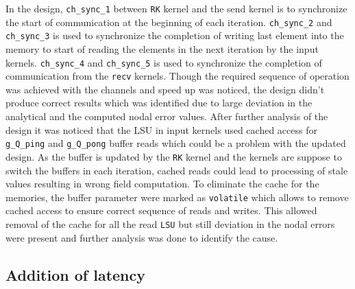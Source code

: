 In the design, \texttt{ch\_sync\_1} between \texttt{RK} kernel and the send kernel is to synchronize
the start of communication at the beginning of each iteration. \texttt{ch\_sync\_2} and
\texttt{ch\_sync\_3} is used to synchronize the completion of writing last element into
the memory to start of reading the elements in the next iteration by the input kernels.
\texttt{ch\_sync\_4} and \texttt{ch\_sync\_5} is used to synchronize the completion
of communication from the \texttt{recv} kernels. Though the required sequence of operation
was achieved with the channels and speed up was noticed, the design didn't produce correct
results which was identified due to large deviation in the analytical and the computed
nodal error values. After further analysis of the design it was noticed that the
\acl{LSU} in input kernels used cached access for \texttt{g\_Q\_ping} and \texttt{g\_Q\_pong}
buffer reads which could be a problem with the updated design. As the buffer is updated by the
\texttt{RK} kernel and the kernels are suppose to switch the buffers in each iteration, cached reads
could lead to processing of stale values resulting in wrong field computation. To eliminate
the cache for the memories, the buffer parameter were marked as \texttt{volatile} which allows
to remove cached access \cite{noauthor_intel_2019,section 9.4} to ensure correct sequence of
reads and writes. This allowed removal
of the cache for all the read \texttt{LSU} but still deviation in the nodal errors were
present and further analysis was done to identify the cause.

\subsection*{Addition of latency}
\label{sec:add_latency}

